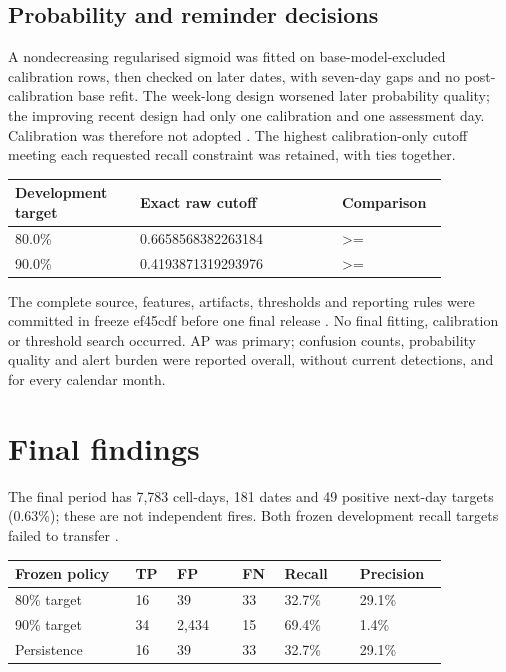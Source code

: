 \subsection*{Probability and reminder decisions}

A nondecreasing regularised sigmoid was fitted on base-model-excluded calibration rows, then checked on later dates, with seven-day gaps and no post-calibration base refit. The week-long design worsened later probability quality; the improving recent design had only one calibration and one assessment day. Calibration was therefore not adopted \cite{mlCalibration}. The highest calibration-only cutoff meeting each requested recall constraint was retained, with ties together.

\begin{center}\small\setlength{\tabcolsep}{3pt}
\begin{tabular}{p{0.267\linewidth}p{0.421\linewidth}p{0.172\linewidth}}
\hline
Development target & Exact raw cutoff & Comparison \\ \hline
80.0\% & 0.6658568382263184 & >= \\
90.0\% & 0.4193871319293976 & >= \\
\hline\end{tabular}\end{center}

The complete source, features, artifacts, thresholds and reporting rules were committed in freeze ef45cdf before one final release \cite{mlFinalEvidence}. No final fitting, calibration or threshold search occurred. AP was primary; confusion counts, probability quality and alert burden were reported overall, without current detections, and for every calendar month.

\clearpage
\section*{Final findings}
The final period has 7,783 cell-days, 181 dates and 49 positive next-day targets (0.63\%); these are not independent fires. Both frozen development recall targets failed to transfer \cite{mlFinalEvidence}.

\begin{center}\small\setlength{\tabcolsep}{3pt}
\begin{tabular}{p{0.241\linewidth}p{0.086\linewidth}p{0.138\linewidth}p{0.086\linewidth}p{0.155\linewidth}p{0.155\linewidth}}
\hline
Frozen policy & TP & FP & FN & Recall & Precision \\ \hline
80\% target & 16 & 39 & 33 & 32.7\% & 29.1\% \\
90\% target & 34 & 2,434 & 15 & 69.4\% & 1.4\% \\
Persistence & 16 & 39 & 33 & 32.7\% & 29.1\% \\
\hline\end{tabular}\end{center}

